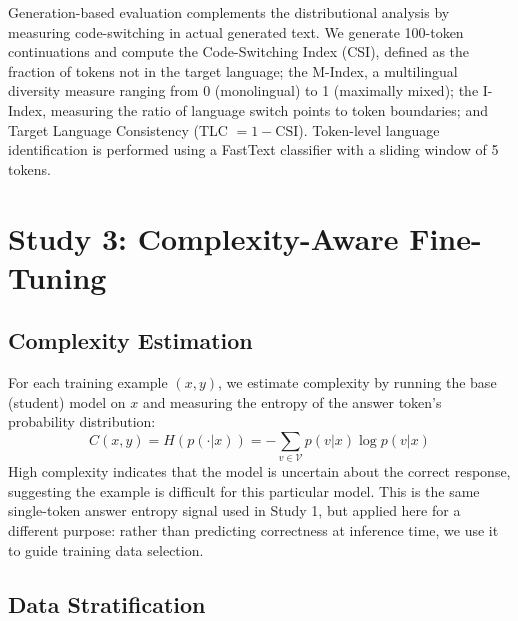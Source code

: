 Generation-based evaluation complements the distributional analysis by measuring code-switching in actual generated text. We generate 100-token continuations and compute the Code-Switching Index (CSI), defined as the fraction of tokens not in the target language; the M-Index, a multilingual diversity measure ranging from 0 (monolingual) to 1 (maximally mixed); the I-Index, measuring the ratio of language switch points to token boundaries; and Target Language Consistency (TLC $= 1 - \text{CSI}$). Token-level language identification is performed using a FastText classifier with a sliding window of 5 tokens.

\section{Study 3: Complexity-Aware Fine-Tuning}

\subsection{Complexity Estimation}

For each training example $(x, y)$, we estimate complexity by running the base (student) model on $x$ and measuring the entropy of the answer token's probability distribution:
\begin{equation}
    C(x, y) = H(p(\cdot | x)) = -\sum_{v \in \mathcal{V}} p(v | x) \log p(v | x)
\end{equation}
High complexity indicates that the model is uncertain about the correct response, suggesting the example is difficult for this particular model. This is the same single-token answer entropy signal used in Study 1, but applied here for a different purpose: rather than predicting correctness at inference time, we use it to guide training data selection.

\subsection{Data Stratification}


